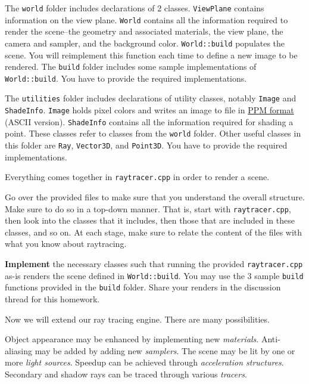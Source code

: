 \documentclass[addpoints]{exam}
\begin{document}
\begin{questions}
The \texttt{world} folder includes declarations of 2 classes. \texttt{ViewPlane} contains information on the view plane. \texttt{World} contains all the information required to render the scene--the geometry and associated materials, the view plane, the camera and sampler, and the background color. \texttt{World::build} populates the scene. You will reimplement this function each time to define a new image to be rendered. The \texttt{build} folder includes some sample implementations of \texttt{World::build}. You have to provide the required implementations.

The \texttt{utilities} folder includes declarations of utility classes, notably \texttt{Image} and \texttt{ShadeInfo}. \texttt{Image} holds pixel colors and writes an image to file in \href{https://en.wikipedia.org/wiki/Netpbm_format#PPM_example}{PPM format} (ASCII version). \texttt{ShadeInfo} contains all the information required for shading a point. These classes refer to classes from the \texttt{world} folder. Other useful classes in this folder are \texttt{Ray}, \texttt{Vector3D}, and \texttt{Point3D}. You have to provide the required implementations.

Everything comes together in \texttt{raytracer.cpp} in order to render a scene.

Go over the provided files to make sure that you understand the overall structure. Make sure to do so in a top-down manner. That is, start with \texttt{raytracer.cpp}, then look into the classes that it includes, then those that are included in these classes, and so on. At each stage, make sure to relate the content of the files with what you know about raytracing.

\textbf{Implement} the necessary classes such that running the  provided \texttt{raytracer.cpp} as-is renders the scene defined in \texttt{World::build}. You may use the 3 sample \texttt{build} functions provided in the \texttt{build} folder. Share your renders in the discussion thread for this homework.


Now we will extend our ray tracing engine. There are many possibilities.

Object appearance may be enhanced by implementing new \emph{materials}. Anti-aliasing may be added by adding new \textit{samplers}. The scene may be lit by one or more \emph{light sources}. Speedup can be achieved through \textit{acceleration structures}. Secondary and shadow rays can be traced through various \textit{tracers}.


\end{questions}
\end{document}
